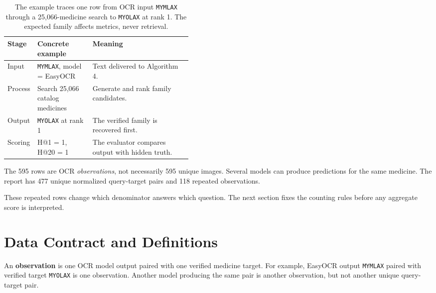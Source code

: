 \documentclass[11pt]{article}
\newcommand{\code}[1]{\texttt{#1}}
\begin{document}
\begin{table}[htbp]
\centering
\small
\begin{tabularx}{\linewidth}{@{}p{0.13\linewidth}p{0.30\linewidth}Y@{}}
\toprule
\textbf{Stage} & \textbf{Concrete example} & \textbf{Meaning} \\
\midrule
Input & \code{MYMLAX}, model = EasyOCR & Text delivered to Algorithm 4. \\
Process & Search 25,066 catalog medicines & Generate and rank family candidates. \\
Output & \code{MYOLAX} at rank 1 & The verified family is recovered first. \\
Scoring & H@1 = 1, H@20 = 1 & The evaluator compares output with hidden truth. \\
\bottomrule
\end{tabularx}
\caption{The example traces one row from OCR input \code{MYMLAX} through a
25,066-medicine search to \code{MYOLAX} at rank 1. The expected family affects
metrics, never retrieval.}
\label{tab:contract}
\end{table}

The 595 rows are OCR \emph{observations}, not necessarily 595 unique images.
Several models can produce predictions for the same medicine. The report has
477 unique normalized query-target pairs and 118 repeated observations.

\FloatBarrier
These repeated rows change which denominator answers which question. The next
section fixes the counting rules before any aggregate score is interpreted.
\section{Data Contract and Definitions}

An \textbf{observation} is one OCR model output paired with one verified
medicine target. For example, EasyOCR output \code{MYMLAX} paired with verified
target \code{MYOLAX} is one observation. Another model producing the same pair
is another observation, but not another unique query-target pair.
\end{document}
